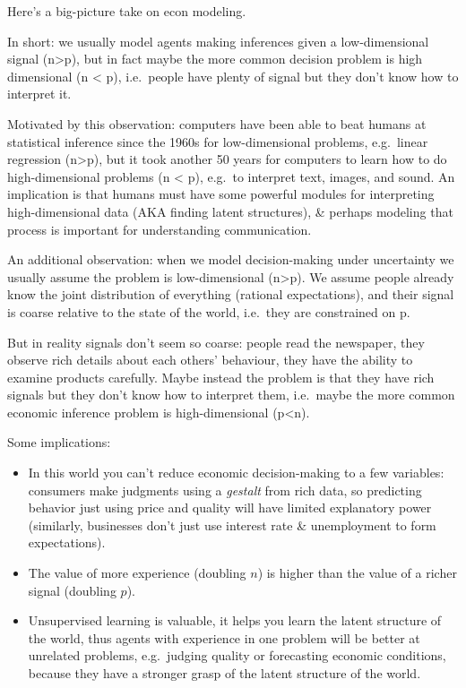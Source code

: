 \documentclass[
  10pt,
  letterpaper,
  DIV=11,
  numbers=noendperiod,
  oneside]{scrartcl}
\begin{document}
Here's a big-picture take on econ modeling.

In short: we usually model agents making inferences given a
low-dimensional signal (n\textgreater p), but in fact maybe the more
common decision problem is high dimensional (n \textless{} p),
i.e.~people have plenty of signal but they don't know how to interpret
it.

Motivated by this observation: computers have been able to beat humans
at statistical inference since the 1960s for low-dimensional problems,
e.g.~linear regression (n\textgreater p), but it took another 50 years
for computers to learn how to do high-dimensional problems (n
\textless{} p), e.g.~to interpret text, images, and sound. An
implication is that humans must have some powerful modules for
interpreting high-dimensional data (AKA finding latent structures), \&
perhaps modeling that process is important for understanding
communication.

An additional observation: when we model decision-making under
uncertainty we usually assume the problem is low-dimensional
(n\textgreater p). We assume people already know the joint distribution
of everything (rational expectations), and their signal is coarse
relative to the state of the world, i.e.~they are constrained on p.~

But in reality signals don't seem so coarse: people read the newspaper,
they observe rich details about each others' behaviour, they have the
ability to examine products carefully. Maybe instead the problem is that
they have rich signals but they don't know how to interpret them,
i.e.~maybe the more common economic inference problem is
high-dimensional (p\textless n).

Some implications:

\begin{itemize}
\item
  In this world you can't reduce economic decision-making to a few
  variables: consumers make judgments using a \emph{gestalt} from rich
  data, so predicting behavior just using price and quality will have
  limited explanatory power (similarly, businesses don't just use
  interest rate \& unemployment to form expectations).
\item
  The value of more experience (doubling \(n\)) is higher than the value
  of a richer signal (doubling \(p\)).
\item
  Unsupervised learning is valuable, it helps you learn the latent
  structure of the world, thus agents with experience in one problem
  will be better at unrelated problems, e.g.~judging quality or
  forecasting economic conditions, because they have a stronger grasp of
  the latent structure of the world.
\end{itemize}
\end{document}

